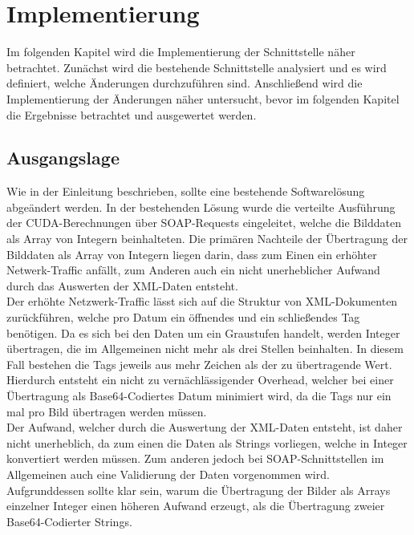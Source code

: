 \section{Implementierung}
Im folgenden Kapitel wird die Implementierung der Schnittstelle n\"aher betrachtet. 
Zun\"achst wird die bestehende Schnittstelle analysiert und es wird definiert, 
welche \"Anderungen durchzuf\"uhren sind. Anschließend wird die Implementierung 
der \"Anderungen n\"aher untersucht, bevor im folgenden Kapitel die Ergebnisse betrachtet 
und ausgewertet werden.

\subsection{Ausgangslage}
Wie in der Einleitung beschrieben, sollte eine bestehende Softwarel\"osung abge\"andert werden.
In der bestehenden L\"osung wurde die verteilte Ausf\"uhrung der CUDA-Berechnungen \"uber SOAP-Requests 
eingeleitet, welche die Bilddaten als Array von Integern beinhalteten. Die prim\"aren Nachteile
der \"Ubertragung der Bilddaten als Array von Integern liegen darin, dass zum Einen ein erh\"ohter
Netwerk-Traffic anf\"allt, zum Anderen auch ein nicht unerheblicher Aufwand durch das Auswerten
der XML-Daten entsteht.\\
Der erh\"ohte Netzwerk-Traffic l\"asst sich auf die Struktur von XML-Dokumenten
zur\"uckf\"uhren, welche pro Datum ein \"offnendes und ein schließendes Tag ben\"otigen. Da es sich bei den 
Daten um ein Graustufen handelt, werden Integer \"ubertragen, die im Allgemeinen nicht mehr als drei
Stellen beinhalten. In diesem Fall bestehen die Tags jeweils aus mehr Zeichen als der zu \"ubertragende
Wert. Hierdurch entsteht ein nicht zu vern\"achl\"assigender Overhead, welcher bei einer \"Ubertragung als
Base64-Codiertes Datum minimiert wird, da die Tags nur ein mal pro Bild \"ubertragen werden m\"ussen.\\
Der Aufwand, welcher durch die Auswertung der XML-Daten entsteht, ist daher nicht unerheblich, da zum einen
die Daten als Strings vorliegen, welche in Integer konvertiert werden m\"ussen. Zum anderen jedoch bei 
SOAP-Schnittstellen im Allgemeinen auch eine Validierung der Daten vorgenommen wird. Aufgrunddessen sollte
klar sein, warum die \"Ubertragung der Bilder als Arrays einzelner Integer einen höheren Aufwand erzeugt, als die 
\"Ubertragung zweier Base64-Codierter Strings.

